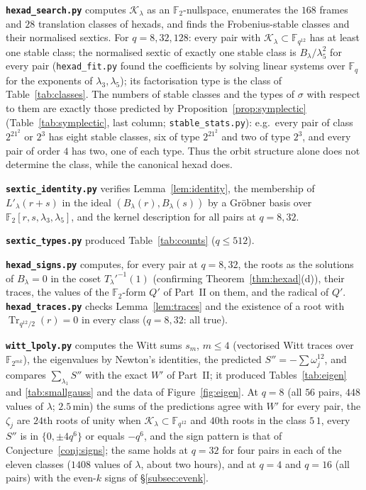 ﻿\documentclass[12pt,a4paper]{amsart}
\theoremstyle{definition}
\newcommand{\F}{\mathbb{F}}
\newcommand{\Tr}{\operatorname{Tr}}
\newcommand{\Kk}{\mathcal{K}}
\newcommand{\Spp}{S''}
\begin{document}
\textbf{\texttt{hexad\_search.py}} computes $\Kk_\lambda$ as an $\F_2$-nullspace, enumerates the $168$ frames and $28$ translation classes of hexads, and finds the Frobenius-stable classes and their normalised sextics. For $q=8,32,128$: every pair with $\Kk_\lambda\subset\F_{q^{12}}$ has at least one stable class; the normalised sextic of exactly one stable class is $B_\lambda/\lambda_5^2$ for every pair (\texttt{hexad\_fit.py} found the coefficients by solving linear systems over $\F_q$ for the exponents of $\lambda_3,\lambda_5$); its factorisation type is the class of Table~\ref{tab:classes}. The numbers of stable classes and the types of $\sigma$ with respect to them are exactly those predicted by Proposition~\ref{prop:symplectic} (Table~\ref{tab:symplectic}, last column; \texttt{stable\_stats.py}): e.g.\ every pair of class $2^21^2$ or $2^3$ has eight stable classes, six of type $2^21^2$ and two of type $2^3$, and every pair of order $4$ has two, one of each type. Thus the orbit structure alone does not determine the class, while the canonical hexad does.

\textbf{\texttt{sextic\_identity.py}} verifies Lemma~\ref{lem:identity}, the membership of $L'_\lambda(r+s)$ in the ideal $(B_\lambda(r),B_\lambda(s))$ by a Gr\"obner basis over $\F_2[r,s,\lambda_3,\lambda_5]$, and the kernel description for all pairs at $q=8,32$.

\textbf{\texttt{sextic\_types.py}} produced Table~\ref{tab:counts} ($q\le512$).

\textbf{\texttt{hexad\_signs.py}} computes, for every pair at $q=8,32$, the roots as the solutions of $B_\lambda=0$ in the coset $T_\lambda'^{-1}(1)$ (confirming Theorem~\ref{thm:hexad}(d)), their traces, the values of the $\F_2$-form $Q'$ of Part~II on them, and the radical of $Q'$. \textbf{\texttt{hexad\_traces.py}} checks Lemma~\ref{lem:traces} and the existence of a root with $\Tr_{q^{12}/2}(r)=0$ in every class ($q=8,32$: all true).

\textbf{\texttt{witt\_lpoly.py}} computes the Witt sums $s_m$, $m\le4$ (vectorised Witt traces over $\F_{2^{mk}}$), the eigenvalues by Newton's identities, the predicted $\Spp=-\sum\omega_j^{12}$, and compares $\sum_{\lambda_1}\Spp$ with the exact $W'$ of Part~II; it produced Tables~\ref{tab:eigen} and \ref{tab:smallgauss} and the data of Figure~\ref{fig:eigen}. At $q=8$ (all $56$ pairs, $448$ values of $\lambda$; $2.5$\,min) the sums of the predictions agree with $W'$ for every pair, the $\zeta_j$ are $24$th roots of unity when $\Kk_\lambda\subset\F_{q^{12}}$ and $40$th roots in the class $5\,1$, every $\Spp$ is in $\{0,\pm4q^6\}$ or equals $-q^6$, and the sign pattern is that of Conjecture~\ref{conj:signs}; the same holds at $q=32$ for four pairs in each of the eleven classes ($1408$ values of $\lambda$, about two hours), and at $q=4$ and $q=16$ (all pairs) with the even-$k$ signs of \S\ref{subsec:evenk}.
\end{document}
